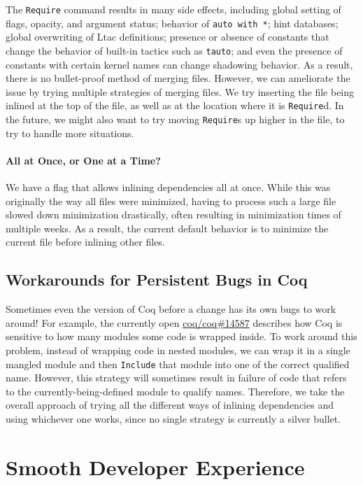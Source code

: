 \documentclass[a4paper,USenglish,cleveref,autoref,thm-restate]{lipics-v2021}
\newcommand{\coqbug}[1]{\href{https://github.com/coq/coq/issues/#1}{coq/coq\##1}}
\begin{document}
The \texttt{Require} command results in many side effects, including global setting of flags, opacity, and argument status; behavior of \texttt{auto with *}; hint databases; global overwriting of Ltac definitions; presence or absence of constants that change the behavior of built-in tactics such as \texttt{tauto}; and even the presence of constants with certain kernel names can change shadowing behavior.
As a result, there is no bullet-proof method of merging files.
However, we can ameliorate the issue by trying multiple strategies of merging files.
We try inserting the file being inlined at the top of the file, as well as at the location where it is \texttt{Require}d.
In the future, we might also want to try moving \texttt{Require}s up higher in the file, to try to handle more situations.

\paragraph{All at Once, or One at a Time?}

We have a flag that allows inlining dependencies all at once.
While this was originally the way all files were minimized, having to process such a large file slowed down minimization drastically, often resulting in minimization times of multiple weeks.
As a result, the current default behavior is to minimize the current file before inlining other files.

\subsection{Workarounds for Persistent Bugs in Coq}

Sometimes even the version of Coq before a change has its own bugs to work around!
For example, the currently open \coqbug{14587} describes how Coq is sensitive to how many modules some code is wrapped inside.
To work around this problem, instead of wrapping code in nested modules, we can wrap it in a single mangled module and then \texttt{Include} that module into one of the correct qualified name.
However, this strategy will sometimes result in failure of code that refers to the currently-being-defined module to qualify names.
Therefore, we take the overall approach of trying all the different ways of inlining dependencies and using whichever one works, since no single strategy is currently a silver bullet.


\section{Smooth Developer Experience}
\end{document}
